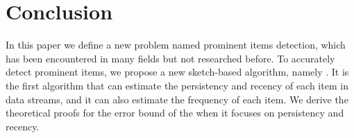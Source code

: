 \presec
\section{Conclusion} \postsec
\label{sec:conclusion}

In this paper we define a new problem named prominent items detection, which has been encountered in many fields but not researched before. To accurately detect prominent items, we propose a new sketch-based algorithm, namely \sketchname{}.
It is the first algorithm that can estimate the persistency and recency of each item in data streams, and it can also estimate the frequency of each item.
We derive the theoretical proofs for the error
bound of the \sketchname{} when it focuses on persistency and recency.




\begin{comment}
\begin{table}[]
    \centering
    \begin{tabular}{|c|c|}
        T & the number of time window \\
        A & array\\
        P & persistency field \\
        F & frequency field\\
        R & recency field \\
        d & number of array in the \sketchname{}
        l & number of bucket in each array
        S & data stream
    \end{tabular}
    \caption{Notation}
    \label{tab:not}
\end{table}
\end{comment}